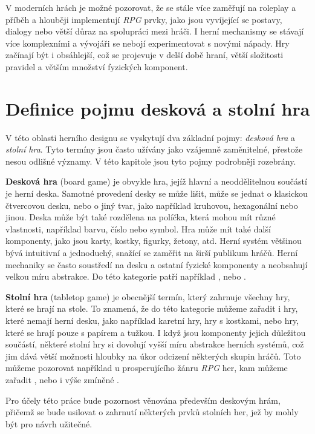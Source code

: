 V moderních hrách je možné pozorovat, že se stále více zaměřují na roleplay a příběh a hlouběji implementují \textit{RPG} prvky, jako jsou vyvíjející se postavy, dialogy nebo větší důraz na spolupráci mezi hráči. I herní mechanismy se stávají více komplexními a vývojáři se nebojí experimentovat s novými nápady. Hry začínají být i obsáhlejší, což se projevuje v delší době hraní, větší složitosti pravidel a větším množství fyzických komponent.


\section{Definice pojmu desková a stolní hra}
\label{subsec:boardgame_definition}

V této oblasti herního designu se vyskytují dva základní pojmy: \textit{desková hra} a \textit{stolní hra}. Tyto termíny jsou často užívány jako vzájemně zaměnitelné, přestože nesou odlišné významy. V této kapitole jsou tyto pojmy podrobněji rozebrány.

\textbf{Desková hra} (board game) je obvykle hra, jejíž hlavní a neoddělitelnou součástí je herní deska. Samotné provedení desky se může lišit, může se jednat o klasickou čtvercovou desku, nebo o jiný tvar, jako například kruhovou, hexagonální nebo jinou. Deska může být také rozdělena na políčka, která mohou mít různé vlastnosti, například barvu, číslo nebo symbol. Hra může mít také další komponenty, jako jsou karty, kostky, figurky, žetony, atd. Herní systém většinou bývá intuitivní a jednoduchý, snažící se zaměřit na širší publikum hráčů. Herní mechaniky se často soustředí na desku a ostatní fyzické komponenty a neobsahují velkou míru abstrakce. Do této kategorie patří například ,  nebo . \cite{board_game_supply_2023}

\textbf{Stolní hra} (tabletop game) je obecnější termín, který zahrnuje všechny hry, které se hrají na stole. To znamená, že do této kategorie můžeme zařadit i hry, které nemají herní desku, jako například karetní hry, hry s kostkami, nebo hry, které se hrají pouze s papírem a tužkou. I když jsou komponenty jejich důležitou součástí, některé stolní hry si dovolují vyšší míru abstrakce herních systémů, což jim dává větší možnosti hloubky na úkor odcizení některých skupin hráčů. Toto můžeme pozorovat například u prosperujícího žánru \textit{RPG} her, kam můžeme zařadit ,  nebo i výše zmíněné . \cite{board_game_supply_2023}

Pro účely této práce bude pozornost věnována především deskovým hrám, přičemž se bude usilovat o zahrnutí některých prvků stolních her, jež by mohly být pro návrh užitečné.
